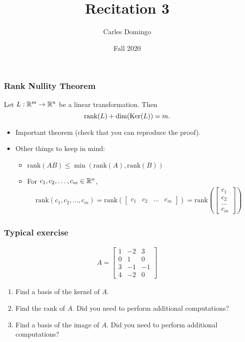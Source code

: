 \documentclass{beamer}
\title{Recitation 3}
\author{Carles Domingo}
\date{Fall 2020}
\begin{document}
\frame{\titlepage} 

\setcounter{showProgressBar}{0}
\setcounter{showSlideNumbers}{1}

\begin{frame}[t]
\frametitle{Rank Nullity Theorem}
\begin{theorem}
	Let $L: \mathbb{R}^m \to \mathbb{R}^n$ be a linear transformation. Then
	$$
	{{\rm rank}}(L) + {{\rm dim}}({{\rm Ker}}(L)) = m.
	$$
\end{theorem}
\begin{itemize}
\item Important theorem (check that you can reproduce the proof).\\
\item Other things to keep in mind:
\begin{itemize}
\item $\text{rank}(AB)\leq \min(\text{rank}(A),\text{rank}(B))$
\item For $c_1, c_2, \dots, c_m \in \mathbb{R}^n$, 
\begin{align*}
\text{rank}(c_1, c_2, \dots, c_m) = \text{rank}(\begin{bmatrix} c_1 & c_2 & \dots & c_m \end{bmatrix}) = \text{rank} \left(\begin{bmatrix} c_1 \\ c_2 \\ \dots \\ c_m \end{bmatrix} \right)
\end{align*}
\end{itemize}
\end{itemize}
\end{frame}

\begin{frame}[t]
\frametitle{Typical exercise} 
\begin{align*}
A = 
\begin{bmatrix}
1 & -2 & 3 \\
0 & 1 & 0 \\
3 & -1 & -1 \\
4 & -2 & 0
\end{bmatrix}
\end{align*}
\begin{enumerate}
\item Find a basis of the kernel of $A$.
\item Find the rank of $A$. Did you need to perform additional computations?
\item Find a basis of the image of $A$. Did you need to perform additional computations?
\end{enumerate}
\end{frame}
\end{document}
